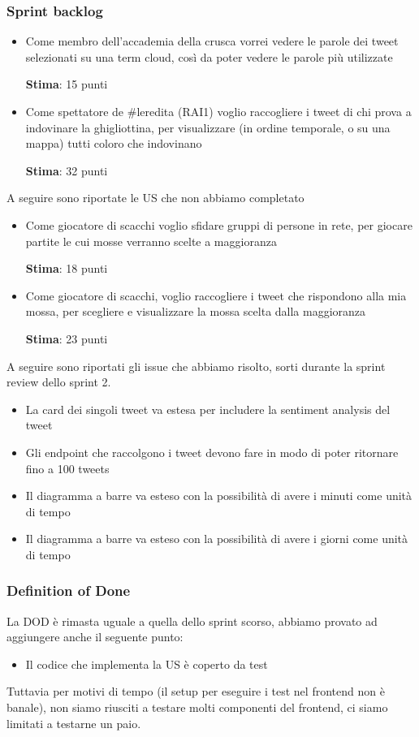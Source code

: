\documentclass{article}
\begin{document}
\subsubsection{Sprint backlog}
\begin{itemize}
    \item Come membro dell'accademia della crusca vorrei vedere le parole dei tweet selezionati su una term cloud, così da poter vedere le parole più utilizzate

    \textbf{Stima}: 15 punti
    \item Come spettatore de \#leredita (RAI1) voglio raccogliere i tweet di chi prova a indovinare la ghigliottina, per visualizzare (in ordine temporale, o su una mappa) tutti coloro che indovinano
    
    \textbf{Stima}: 32 punti
\end{itemize}
A seguire sono riportate le US che non abbiamo completato
\begin{itemize}
    \item Come giocatore di scacchi voglio sfidare gruppi di persone in rete, per giocare partite le cui mosse verranno scelte a maggioranza

    \textbf{Stima}: 18 punti
    \item Come giocatore di scacchi, voglio raccogliere i tweet che rispondono alla mia mossa, per scegliere e visualizzare la mossa scelta dalla maggioranza

    \textbf{Stima}: 23 punti
\end{itemize}
A seguire sono riportati gli issue che abbiamo risolto, sorti durante la sprint review dello sprint 2.
\begin{itemize}
    \item La card dei singoli tweet va estesa per includere la sentiment analysis del tweet
    \item Gli endpoint che raccolgono i tweet devono fare in modo di poter ritornare fino a 100 tweets
    \item Il diagramma a barre va esteso con la possibilità di avere i minuti come unità di tempo
    \item Il diagramma a barre va esteso con la possibilità di avere i giorni come unità di tempo
\end{itemize}
\subsubsection{Definition of Done}
La DOD \`e rimasta uguale a quella dello sprint scorso, abbiamo provato ad aggiungere anche il seguente punto:
\begin{itemize}
    \item Il codice che implementa la US \`e coperto da test
\end{itemize}
Tuttavia per motivi di tempo (il setup per eseguire i test nel frontend non \`e banale), non siamo riusciti a testare molti componenti del frontend, ci siamo limitati a testarne un paio.
\end{document}
